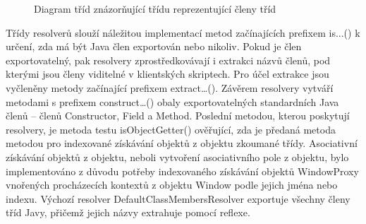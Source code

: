 \begin{figure}[H]
  \begin{center}
    \caption{Diagram tříd znázorňující třídu reprezentující členy tříd}
    \label{Figure.ClassMembers}
  \end{center}
\end{figure}

Třídy resolverů slouží náležitou implementací metod začínajících prefixem is...() k určení, zda má být Java člen exportován nebo nikoliv. Pokud je člen exportovatelný, pak resolvery zprostředkovávají i extrakci názvů členů, pod kterými jsou členy viditelné v klientských skriptech. Pro účel extrakce jsou vyčleněny metody začínající prefixem extract…(). Závěrem resolvery vytváří metodami s prefixem construct…() obaly exportovatelných standardních Java členů -- členů Constructor, Field a Method. Poslední metodou, kterou poskytují resolvery, je metoda testu isObjectGetter() ověřující, zda je předaná metoda metodou pro indexované získávání objektů z objektu zkoumané třídy. Asociativní získávání objektů z objektu, neboli vytvoření asociativního pole z objektu, bylo implementováno z důvodu potřeby indexovaného získávání objektů WindowProxy vnořených procházecích kontextů z objektu Window podle jejich jména nebo indexu. Výchozí resolver DefaultClassMembersResolver exportuje všechny členy tříd Javy, přičemž jejich názvy extrahuje pomocí reflexe.

